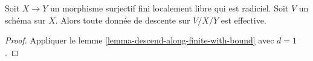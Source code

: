 \begin{lemma}
\label{lemma-descend-along-finite-radicial}
Soit $X \to Y$ un morphisme surjectif fini localement libre qui est radiciel.
Soit $V$ un schéma sur $X$. Alors toute donnée de descente sur $V/X/Y$ est effective.
\end{lemma}

\begin{proof}
Appliquer le lemme \ref{lemma-descend-along-finite-with-bound} avec $d = 1$.
\end{proof}














